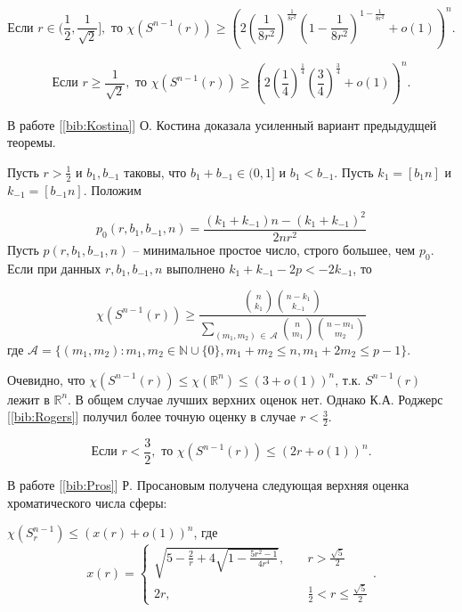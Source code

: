 \begin{theorem1}

$$\text{Если } r \in (\frac{1}{2}, \frac{1}{\sqrt{2}}], \text{ то } 
\chi(S^{n-1}(r)) \geq \left(2(\frac{1}{8r^2})^{\frac{1}{8r^2}}(1-\frac{1}{8r^2})^{1-\frac{1}{8r^2}}+o(1)\right)^n.$$ 

$$\text{Если } r \geq \frac{1}{\sqrt{2}}, \text{ то } 
\chi(S^{n-1}(r)) \geq \left(2(\frac{1}{4})^{\frac{1}{4}}(\frac{3}{4})^{\frac{3}{4}}+o(1)\right)^n.$$

\end{theorem1}
В работе [\ref{bib:Kostina}] О. Костина доказала усиленный вариант предыдудщей теоремы.

\begin{theorem1}
Пусть $r > \tfrac{1}{2}$ и $b_1, b_{-1}$ таковы, что $b_1 + b_{-1} \in (0,1]$ и $b_1 < b_{-1}$.
Пусть $k_1=[b_1n]$ и $k_{-1}=[b_{-1}n]$. Положим

$$p_0(r,b_1,b_{-1},n) = \frac{(k_1 + k_{-1})n - (k_1 + k_{-1})^2}{2nr^2}$$
Пусть $p(r,b_1,b_{-1},n)$ -- минимальное простое число, строго большее, чем $p_0$. 
Если при данных $r,b_1,b_{-1},n$ выполнено $k_1 + k_{-1} - 2p < -2k_{-1}$, то

$$\chi(S^{n-1}(r)) \geq 
\frac{\binom{n}{k_1}\binom{n-k_1}{k_{-1}}}
{\sum\limits_{(m_1,m_2) \, \in \, \mathcal{A}} \binom{n}{m_1} \binom{n-m_1}{m_2}}$$
где $\mathcal{A} = \{ (m_1,m_2): m_1,m_2 \in \mathbb{N} \cup \{ 0 \}, m_1+m_2 \leq n, m_1+2m_2 \leq p-1 \}$.

\end{theorem1}

Очевидно, что $\chi(S^{n-1}(r)) \leq \chi(\mathbb{R}^n) \leq (3+o(1))^n$, т.к. $S^{n-1}(r)$ лежит в $\mathbb{R}^n$. В общем случае лучших верхних оценок нет. Однако К.А. Роджерс [\ref{bib:Rogers}] получил более точную оценку в случае $r < \frac{3}{2}$.

\begin{theorem1}
$$\text{Если } r < \frac{3}{2}, \text{ то } \chi(S^{n-1}(r)) \leq (2r+o(1))^n.$$
\end{theorem1}

В работе [\ref{bib:Pros}] Р. Просановым получена следующая верхняя оценка хроматического числа сферы:

\begin{theorem1}
$\chi(S_r^{n-1}) \leq (x(r)+o(1))^n$, где
$$ x(r) = 
\begin{cases}
\sqrt{5-\frac{2}{r}+4\sqrt{1-\frac{5r^2-1}{4r^4}}},& \quad r > \frac{\sqrt{5}}{2} \\ 
2r,& \quad \frac{1}{2} < r \leq  \frac{\sqrt{5}}{2}
\end{cases}.$$
\end{theorem1}

